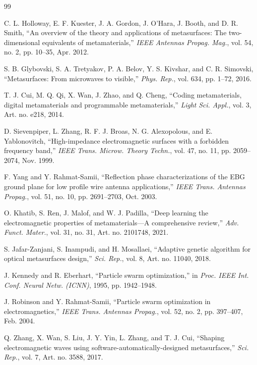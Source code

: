 \documentclass[journal]{IEEEtran}
\begin{document}
\begin{thebibliography}{99}

 C. L. Holloway, E. F. Kuester, J. A. Gordon, J. O'Hara, J. Booth, and D. R. Smith, ``An overview of the theory and applications of metasurfaces: The two-dimensional equivalents of metamaterials,'' \textit{IEEE Antennas Propag. Mag.}, vol. 54, no. 2, pp. 10--35, Apr. 2012.

 S. B. Glybovski, S. A. Tretyakov, P. A. Belov, Y. S. Kivshar, and C. R. Simovski, ``Metasurfaces: From microwaves to visible,'' \textit{Phys. Rep.}, vol. 634, pp. 1--72, 2016.

 T. J. Cui, M. Q. Qi, X. Wan, J. Zhao, and Q. Cheng, ``Coding metamaterials, digital metamaterials and programmable metamaterials,'' \textit{Light Sci. Appl.}, vol. 3, Art. no. e218, 2014.

 D. Sievenpiper, L. Zhang, R. F. J. Broas, N. G. Alexopolous, and E. Yablonovitch, ``High-impedance electromagnetic surfaces with a forbidden frequency band,'' \textit{IEEE Trans. Microw. Theory Techn.}, vol. 47, no. 11, pp. 2059--2074, Nov. 1999.

 F. Yang and Y. Rahmat-Samii, ``Reflection phase characterizations of the EBG ground plane for low profile wire antenna applications,'' \textit{IEEE Trans. Antennas Propag.}, vol. 51, no. 10, pp. 2691--2703, Oct. 2003.

 O. Khatib, S. Ren, J. Malof, and W. J. Padilla, ``Deep learning the electromagnetic properties of metamaterials---A comprehensive review,'' \textit{Adv. Funct. Mater.}, vol. 31, no. 31, Art. no. 2101748, 2021.

 S. Jafar-Zanjani, S. Inampudi, and H. Mosallaei, ``Adaptive genetic algorithm for optical metasurfaces design,'' \textit{Sci. Rep.}, vol. 8, Art. no. 11040, 2018.

 J. Kennedy and R. Eberhart, ``Particle swarm optimization,'' in \textit{Proc. IEEE Int. Conf. Neural Netw. (ICNN)}, 1995, pp. 1942--1948.

 J. Robinson and Y. Rahmat-Samii, ``Particle swarm optimization in electromagnetics,'' \textit{IEEE Trans. Antennas Propag.}, vol. 52, no. 2, pp. 397--407, Feb. 2004.

 Q. Zhang, X. Wan, S. Liu, J. Y. Yin, L. Zhang, and T. J. Cui, ``Shaping electromagnetic waves using software-automatically-designed metasurfaces,'' \textit{Sci. Rep.}, vol. 7, Art. no. 3588, 2017.


\end{thebibliography}
\end{document}
